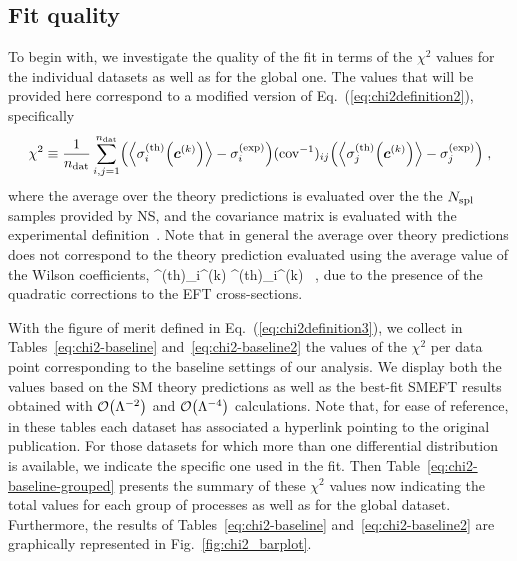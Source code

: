 \subsection{Fit quality}

To begin with, we investigate the quality of the fit in terms
of the $\chi^2$ values for the individual
datasets as well as for the global one.
%
The values that will be provided here correspond to
a modified version of Eq.~(\ref{eq:chi2definition2}),
specifically
\begin{equation}
  \chi^2 \equiv \frac{1}{n_{\rm dat}}\sum_{i,j=1}^{n_{\rm dat}}\lp 
  \la \sigma^{(\rm th)}_i\lp {\boldsymbol c}^{(k)} \rp \ra
  -\sigma^{(\rm exp)}_i\rp ({\rm cov}^{-1})_{ij}
\lp 
 \la \sigma^{(\rm th)}_j\lp {\boldsymbol c}^{(k)} \rp \ra
  -\sigma^{(\rm exp)}_j\rp
 \label{eq:chi2definition3}
    \; ,
\end{equation}
where the average over the theory predictions is evaluated over the the $N_{\rm spl}$ samples
provided by NS,
and the covariance matrix is evaluated with the  experimental definition~\cite{Ball:2012wy}.
%
Note that in general the average over theory predictions does not correspond to the theory
prediction evaluated using the average value of the Wilson coefficients,
\be
\la \sigma^{(\rm th)}_i^{(k)} \rp \ra \ne
\sigma^{(\rm th)}_i\lp {}^{(k)}  \ra \rp \, , 
\ee
due to the presence of the quadratic corrections to the EFT cross-sections.

With the figure of merit defined in Eq.~(\ref{eq:chi2definition3}),
we collect in Tables~\ref{eq:chi2-baseline} and~\ref{eq:chi2-baseline2}
the values of the $\chi^2$ per data point corresponding to
the baseline settings of our analysis.
%
We display both the values based on the SM theory predictions
as well as the best-fit SMEFT results obtained with $\mathcal{O}\lp \Lambda^{-2}\rp$ and
$\mathcal{O}\lp \Lambda^{-4}\rp$ calculations.
%
Note that, for ease of reference, in these tables
each dataset has associated a hyperlink pointing to the original publication.
%
For those datasets for which more than one differential distribution is available, we indicate the specific one used in the fit.
%
Then Table~\ref{eq:chi2-baseline-grouped} presents the
summary of these $\chi^2$ values now indicating the total values for each group of processes
as well as for the global dataset.
%
Furthermore, the results of Tables~\ref{eq:chi2-baseline}
and~\ref{eq:chi2-baseline2} are graphically represented in Fig.~\ref{fig:chi2_barplot}.



